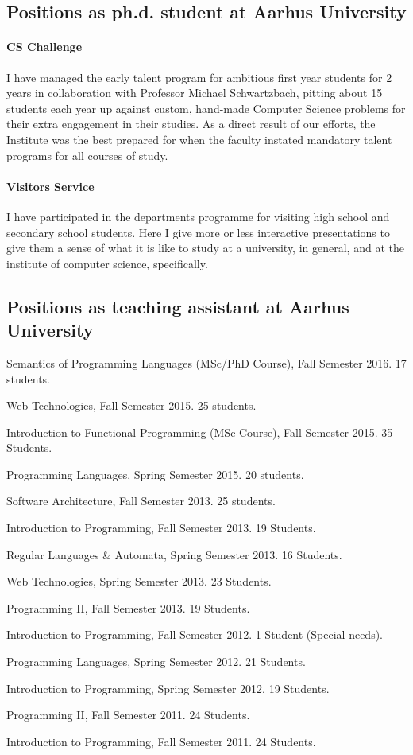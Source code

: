 \documentclass[10pt,letterpaper]{article}
\renewenvironment{itemize}{
  \begin{list}{}{
    \setlength{\leftmargin}{1.5em}
    \setlength{\itemsep}{0.25em}
    \setlength{\parskip}{0pt}
    \setlength{\parsep}{0.25em}
  }
}{
  \end{list}
}
\begin{document}
\subsection*{Positions as ph.d. student at Aarhus University}

\paragraph{CS Challenge} I have managed the early talent program for ambitious
first year students for 2 years in collaboration with Professor Michael
Schwartzbach, pitting about 15 students each year up against custom, hand-made
Computer Science problems for their extra engagement in their studies. As a
direct result of our efforts, the Institute was the best prepared for when the
faculty instated mandatory talent programs for all courses of study.

\paragraph{Visitors Service} I have participated in the departments programme
for visiting high school and secondary school students. Here I give more or less
interactive presentations to give them a sense of what it is like to study at a
university, in general, and at the institute of computer science, specifically.
\subsection*{Positions as teaching assistant at Aarhus University}

\begin{itemize}
\item Semantics of Programming Languages (MSc/PhD Course),
  Fall Semester 2016. 17 students.
\item Web Technologies,
  Fall Semester 2015. 25 students.
\item Introduction to Functional Programming (MSc Course),
  Fall Semester 2015. 35 Students.
\item Programming Languages,
  Spring Semester 2015. 20 students.
\item Software Architecture,
  Fall Semester 2013. 25 students.
\item Introduction to Programming,
  Fall Semester 2013. 19 Students.
\item Regular Languages \& Automata,
  Spring Semester 2013. 16 Students.
\item Web Technologies,
  Spring Semester 2013. 23 Students.
\item Programming II, 
  Fall Semester 2013. 19 Students.
\item Introduction to Programming,
  Fall Semester 2012. 1 Student (Special needs).
\item Programming Languages,
  Spring Semester 2012. 21 Students.
\item Introduction to Programming,
  Spring Semester 2012. 19 Students.
\item Programming II,
  Fall Semester 2011. 24 Students.
\item Introduction to Programming,
  Fall Semester 2011. 24 Students.
\end{itemize}
\end{document}

